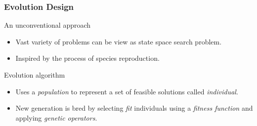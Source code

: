 \documentclass[11pt]{beamer}
\begin{document}
	\begin{frame}
		\frametitle{Evolution Design}
		\begin{block}{An unconventional approach}
			\begin{itemize}[<+->]
				\item Vast variety of problems can be view as state space search problem.
				\item Inspired by the process of species reproduction.
			\end{itemize}
		\end{block}
		\begin{block}{Evolution algorithm}
			\begin{itemize}[<+->]
				\item Uses a \textit{population} to represent a set of feasible solutions called \textit{individual}.
				\item New generation is bred by selecting \textit{fit} individuals using a \textit{fitness function} 
					and applying \textit{genetic operators}.
			\end{itemize}  
		\end{block}
	\end{frame}
	
\end{document}
